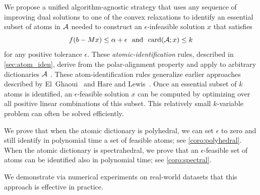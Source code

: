 We propose a unified algorithm-agnostic strategy that uses any sequence of improving dual solutions to one of the convex relaxations to identify an essential subset of atoms in $\mathcal{A}$ needed to construct an $\epsilon$-infeasible solution $x$ that satisfies
\begin{equation} \label{eq:feasible}
    f(b - Mx) \leq \alpha + \epsilon \enspace\mathop{\hbox{\rm and}}\enspace \operatorname{card}(\mathcal{A}; x) \leq k
\end{equation}
for any positive tolerance $\epsilon$. These \emph{atomic-identification} rules, described in \autoref{sec:atom_iden}, derive from the polar-alignment property and apply to arbitrary dictionaries $\mathcal{A}$ \cite{fan2019alignment}. These atom-identification rules generalize earlier approaches described by El~Ghaoui~\cite{Ghaoui12} and Hare and Lewis~\cite{hare2004identifying}. Once an essential subset of $k$ atoms is identified, an $\epsilon$-feasible solution $x$ can be computed by optimizing over all positive linear combinations of this subset. This relatively small $k$-variable problem can often be solved efficiently.

We prove that when the atomic dictionary is polyhedral, we can set $\epsilon$ to zero and still identify in polynomial time a set of feasible atoms; see \autoref{coro:polyhedral}. When the atomic dictionary is spectrahedral, we prove that an $\epsilon$-feasible set of atoms can be identified also in polynomial time; see \autoref{coro:spectral}. 

We demonstrate via numerical experiments on real-world datasets that this approach is effective in practice.

